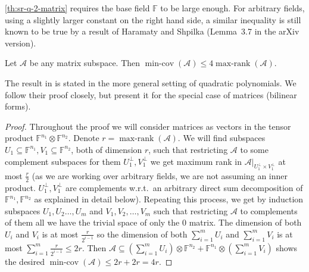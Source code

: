 \documentclass{daj}
\newcommand{\FF}{\mathbb{F}}
\DeclareMathOperator{\maxrank}{max-rank}
\DeclareMathOperator{\mincov}{min-cov}
\begin{document}
\autoref{th:sr-q-2-matrix} requires the base field $\FF$ to be large enough. For arbitrary fields, using a slightly larger constant on the right hand side, a similar inequality is still known to be true by a result of Haramaty and Shpilka \cite[Lemma 3.5]{haramaty2010structure} (Lemma~3.7 in the arXiv version).

\begin{lemma}\label{thm:sri_leq_4Qi-matrix} %
    Let $\mathcal{A}$ be any matrix subspace. Then $\mincov(\mathcal{A}) \leq 4 \maxrank(\mathcal{A})$.
\end{lemma}
%
The result in \cite[Lemma 3.5]{haramaty2010structure} is stated in the more general setting of quadratic polynomials. We follow their proof closely, but present it for the special case of matrices (bilinear forms).
\begin{proof}
%
%
%
    Throughout the proof we will consider matrices as vectors in the tensor product $\FF^{n_1}\otimes\FF^{n_2}$.
    Denote $r=\maxrank(\mathcal{A})$. We will find subspaces $U_1\subseteq\FF^{n_1},V_1\subseteq\FF^{n_2}$, both of dimension $r$, such that restricting $\mathcal{A}$ to some complement subspaces for them $U_1^\perp,V_1^\perp$
    we get maximum rank in $\mathcal{A}|_{U_1^\perp\times V_1^\perp}$ at most $\frac{r}{2}$ (as we are working 
    over arbitrary fields, we are not assuming an inner product. $U_1^\perp,V_1^\perp$ are complements w.r.t.\ an arbitrary direct sum decomposition of $\FF^{n_1},\FF^{n_2}$ as explained in detail below). Repeating this process, we get by induction subspaces $U_1,U_2\dots,U_m$ and $V_1,V_2,\dots,V_m$ such that restricting $\mathcal{A}$ to complements of them all we have the trivial space of only the $0$ matrix. The dimension of both $U_i$ and $V_i$ is at most $\frac{r}{2^{i-1}}$ so the dimension of both $\sum_{i=1}^m U_i$ and $\sum_{i=1}^m V_i$ is at most $\sum_{i=1}^m\frac{r}{2^{i-1}}\leq 2r$. Then $\mathcal{A}\subseteq (\sum_{i=1}^m U_i)\otimes\FF^{n_2}+\FF^{n_1}\otimes(\sum_{i=1}^m V_i)$ shows the desired $\mincov(\mathcal{A})\leq 2r+2r=4r$.


\end{proof}
\end{document}
